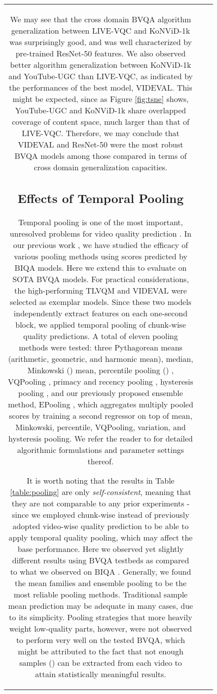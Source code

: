 \documentclass[journal]{IEEEtran}
\begin{document}
\begin{figure}[!t]
\begin{tabular}{ccc}
We may see that the cross domain BVQA algorithm generalization between LIVE-VQC and KoNViD-1k was surprisingly good, and was well characterized by pre-trained ResNet-50 features. We also observed better algorithm generalization between KoNViD-1k and YouTube-UGC than LIVE-VQC, as indicated by the performances of the best model, VIDEVAL. This might be expected, since as Figure \ref{fig:tsne} shows, YouTube-UGC and KoNViD-1k share overlapped coverage of content space, much larger than that of LIVE-VQC. Therefore, we may conclude that VIDEVAL and ResNet-50 were the most robust BVQA models among those compared in terms of cross domain generalization capacities.

\subsection{Effects of Temporal Pooling}

Temporal pooling is one of the most important, unresolved problems for video quality prediction \cite{park2012video, tu2020comparative,seshadrinathan2011temporal, korhonen2019two, bampis2018recurrent}. In our previous work \cite{tu2020comparative}, we have studied the efficacy of various pooling methods using scores predicted by BIQA models. Here we extend this to evaluate on SOTA BVQA models. For practical considerations, the high-performing TLVQM and VIDEVAL were selected as exemplar models. Since these two models independently extract features on each one-second block, we applied temporal pooling of chunk-wise quality predictions. A total of eleven pooling methods were tested: three Pythagorean means (arithmetic, geometric, and harmonic mean), median, Minkowski () mean, percentile pooling () \cite{moorthy2009visual}, VQPooling \cite{park2012video}, primacy and recency pooling \cite{murdock1962serial}, hysteresis pooling \cite{seshadrinathan2011temporal}, and our previously proposed ensemble method, EPooling \cite{tu2020comparative}, which aggregates multiply pooled scores by training a second regressor on top of mean, Minkowski, percentile, VQPooling, variation, and hysteresis pooling. We refer the reader to \cite{tu2020comparative} for detailed algorithmic formulations and parameter settings thereof.

It is worth noting that the results in Table \ref{table:pooling} are only \textit{self-consistent}, meaning that they are not comparable to any prior experiments - since we employed chunk-wise instead of previously adopted video-wise quality prediction to be able to apply temporal quality pooling, which may affect the base performance. Here we observed yet slightly different results using BVQA testbeds as compared to what we observed on BIQA \cite{tu2020comparative}. Generally, we found the mean families and ensemble pooling to be the most reliable pooling methods. Traditional sample mean prediction may be adequate in many cases, due to its simplicity. Pooling strategies that more heavily weight low-quality parts, however, were not observed to perform very well on the tested BVQA, which might be attributed to the fact that not enough samples () can be extracted from each video to attain statistically meaningful results.


\end{tabular}
\end{figure}
\end{document}
